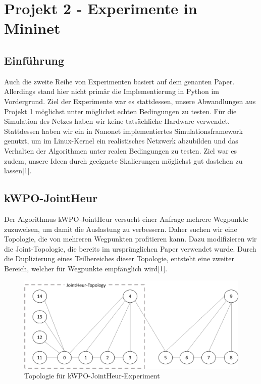 \documentclass[sigconf,noacm,review]{acmart}
\begin{document}
\section{Projekt 2 - Experimente in Mininet}
\subsection{Einführung}
Auch die zweite Reihe von Experimenten basiert auf dem genanten Paper. Allerdings stand hier nicht primär die Implementierung in Python im Vordergrund. Ziel der Experimente war es stattdessen,
unsere Abwandlungen aus Projekt 1 möglichst unter möglichst echten Bedingungen zu testen. Für die Simulation des Netzes haben wir keine tatsächliche Hardware verwendet.
Stattdessen haben wir ein in Nanonet implementiertes Simulationsframework genutzt, um im Linux-Kernel ein realistisches Netzwerk abzubilden und das Verhalten der Algorithmen unter realen Bedingungen zu testen. Ziel war es zudem, unsere Ideen durch geeignete Skalierungen möglichst gut dastehen zu lassen[1].

\subsection{kWPO-JointHeur}
Der Algorithmus kWPO-JointHeur versucht einer Anfrage mehrere Wegpunkte zuzuweisen, um damit die Auslastung zu verbessern. Daher suchen wir eine Topologie, die von mehreren Wegpunkten profitieren kann. Dazu modifizieren wir die Joint-Topologie, die bereits im ursprünglichen Paper verwendet wurde. Durch die Duplizierung eines Teilbereiches dieser Topologie, entsteht eine zweiter Bereich, welcher für Wegpunkte empfänglich wird[1].
\begin{figure}[h]
  \centering
  \includegraphics[width=\linewidth]{abbildungen/kWPO_topo.png}
  \caption{Topologie für kWPO-JointHeur-Experiment}
\end{figure}
\end{document}

